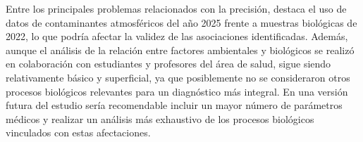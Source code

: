 \documentclass[eng]{ajceam-class}
\begin{document}
Entre los principales problemas relacionados con la precisión, destaca el uso de datos de contaminantes atmosféricos del año 2025 frente a muestras biológicas de 2022, lo que podría afectar la validez de las asociaciones identificadas. Además, aunque el análisis de la relación entre factores ambientales y biológicos se realizó en colaboración con estudiantes y profesores del área de salud, sigue siendo relativamente básico y superficial, ya que posiblemente no se consideraron otros procesos biológicos relevantes para un diagnóstico más integral. En una versión futura del estudio sería recomendable incluir un mayor número de parámetros médicos y realizar un análisis más exhaustivo de los procesos biológicos vinculados con estas afectaciones.


\end{document}

